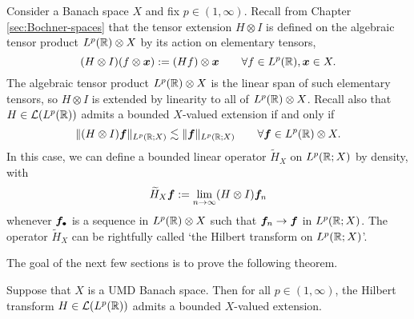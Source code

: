 Consider a Banach space $X$ and fix $p \in (1,\infty)$.
Recall from Chapter \ref{sec:Bochner-spaces} that the tensor extension $H \otimes I$ is defined on the algebraic tensor product $L^p(\mathbb{R}) \otimes X$ by its action on elementary tensors,
\begin{equation*}
  (H \otimes I)(f \otimes \bm{x}) := (Hf) \otimes \bm{x} \qquad \forall f \in L^p(\mathbb{R}), \bm{x} \in X.
\end{equation*}
The algebraic tensor product $L^p(\mathbb{R}) \otimes X$ is the linear span of such elementary tensors, so $H \otimes I$ is extended by linearity to all of $L^p(\mathbb{R}) \otimes X$.
Recall also that $H \in \mathcal{L}(L^p(\mathbb{R}))$ admits a bounded $X$-valued extension if and only if
\begin{equation*}
  \|(H \otimes I)\bm{f}\|_{L^p(\mathbb{R};X)} \lesssim \|\bm{f}\|_{L^p(\mathbb{R};X)} \qquad \forall \bm{f} \in L^p(\mathbb{R}) \otimes X.
\end{equation*}
In this case, we can define a bounded linear operator $\widetilde{H}_{X}$ on $L^p(\mathbb{R};X)$ by density, with
\begin{equation*}
  \widetilde{H}_{X} \bm{f} := \lim_{n \to \infty} (H \otimes I)\bm{f}_{n}
\end{equation*}
whenever $\bm{f}_{\bullet}$ is a sequence in $L^p(\mathbb{R}) \otimes X$ such that $\bm{f}_{n} \to \bm{f}$ in $L^p(\mathbb{R};X)$.
The operator $\widetilde{H}_{X}$ can be rightfully called `the Hilbert transform on $L^p(\mathbb{R};X)$'.

The goal of the next few sections is to prove the following theorem.

\begin{thm}[Burkholder]\label{thm:Burkholder}
  Suppose that $X$ is a UMD Banach space.
  Then for all $p \in (1,\infty)$, the Hilbert transform $H \in \mathcal{L}(L^p(\mathbb{R}))$ admits a bounded $X$-valued extension.
\end{thm}

